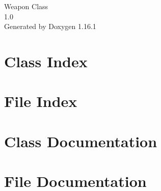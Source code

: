 \documentclass[twoside]{book}
\newcommand{\+}{\discretionary{\mbox{\scriptsize$\hookleftarrow$}}{}{}}
\newcommand{\clearemptydoublepage}{%
    \newpage{\pagestyle{empty}\cleardoublepage}%
  }
\begin{document}
  \raggedbottom
    \hypersetup{pageanchor=false,
                bookmarksnumbered=true,
                pdfencoding=unicode
               }
  \begin{titlepage}
  \vspace*{7cm}
  \begin{center}%
  {\Large Weapon Class}\\
  [1ex]\large 1.\+0 \\
  \vspace*{1cm}
  {\large Generated by Doxygen 1.16.1}\\
  \end{center}
  \end{titlepage}
  \clearemptydoublepage
  \tableofcontents
  \clearemptydoublepage
  \hypersetup{pageanchor=true}
\chapter{Class Index}

\chapter{File Index}

\chapter{Class Documentation}

\chapter{File Documentation}



  \backmatter
  \newpage
  \clearemptydoublepage
  \printindex
\end{document}
